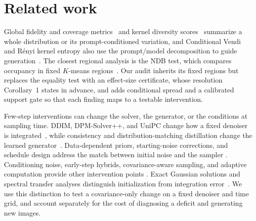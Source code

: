 \section{Related work}
\label{sec:related}
Global fidelity and coverage metrics~\cite{kynkaanniemi2019improved,naeem2020density,alaa2022faithful}
and kernel diversity scores~\cite{friedman2023vendi,ospanov2025scendi}
summarize a whole distribution or its prompt-conditioned variation, and
Conditional Vendi and R\'enyi kernel entropy also use the prompt/model
decomposition to guide generation~\cite{jalali2026conditional}. The
closest regional analysis is the NDB test, which compares occupancy in
fixed $K$-means regions~\cite{richardson2018ndb}. Our audit inherits its
fixed regions but replaces the equality test with an effect-size
certificate, whose resolution Corollary~1 states in advance, and adds
conditional spread and a calibrated support gate so that each finding
maps to a testable intervention.

Few-step interventions can change the solver, the generator, or the
conditions at sampling time. DDIM, DPM-Solver++, and UniPC change how a
fixed denoiser is integrated~\cite{song2021ddim,lu2022dpmpp,zhao2023unipc},
while consistency and distribution-matching distillation change the
learned generator~\cite{luo2024lcm,luo2023lcmlora,yin2024dmd2}.
Data-dependent priors, starting-noise corrections, and schedule design
address the match between initial noise and the sampler
\cite{lee2022priorgrad,zheng2023truncated,hu2024onemore,lin2024flawed,sabour2024align}.
Conditioning noise, early-step hybrids, covariance-aware sampling, and
adaptive computation provide other intervention points
\cite{sadat2024cads,gandikota2026diversity,schioppa2026covariance,zhang2025adadiff,li2024budgetfusion,binici2026adsc}.
Exact Gaussian solutions and spectral transfer analyses distinguish
initialization from integration error~\cite{pierret2025gaussian,benita2025spectral}.
We use this distinction to test a covariance-only change on a fixed
denoiser and time grid, and account separately for the cost of diagnosing
a deficit and generating new images.
